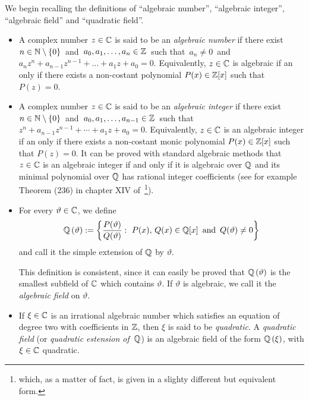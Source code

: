We begin recalling the definitions of ``algebraic number'',
``algebraic integer'', ``algebraic field'' and ``quadratic
field''.
\begin{itemize}

\item A complex number $z \in \mathbb{C}$ is said to be an
\emph{algebraic number\/} if there exist
\mbox{$n \in \mathbb{N}\setminus\left\{0\right\}$}\, and\, $a_0, a_1, \ldots, a_n \in \mathbb{Z}$\,
such that\, $a_n \neq 0$\, and\,
$a_n z^n + a_{n-1} z^{n-1} + \ldots + a_1z + a_0 = 0$.
Equivalently, $z \in \mathbb{C}$ is algebraic if an only if
there exists a non-costant polynomial $P(x) \in \mathbb{Z}[x]$
such that $P(z) = 0$.

\item A complex number $z \in \mathbb{C}$ is said to be an
\emph{algebraic integer\/} if there exist
\mbox{$n \in \mathbb{N}\setminus\left\{0\right\}$}\, and\,
$a_0, a_1, \ldots, a_{n-1} \in \mathbb{Z}$\, such that\,
$z^n + a_{n-1}z^{n-1} + \cdots + a_1z + a_0 = 0$.
Equivalently, $z \in \mathbb{C}$ is an algebraic integer if an
only if there exists a non-costant monic polynomial
$P(x) \in \mathbb{Z}[x]$ such that $P(z) = 0$. It can be proved with
standard algebraic methods that $z \in \mathbb{C}$ is an algebraic
integer if and only if it is algebraic over $\mathbb{Q}$ and its
minimal polynomial over $\mathbb{Q}$ has rational integer
coefficients (see for example Theorem (236) in chapter XIV
of~\cite{H&W}\footnote{which, as a matter of fact, is given
in a slighty different but equivalent form.}).

\item For every $\vartheta \in \mathbb{C}$, we define
\begin{displaymath}
\mathbb{Q}\left(\vartheta\right):= \left\{ \frac{P(\vartheta)}{Q(\vartheta)}:
\ P(x),\, Q(x) \in \mathbb{Q}[x]\ \textrm{\,and\,}\ Q(\vartheta) \neq 0 \right\}
\end{displaymath}
and call it the simple extension of $\mathbb{Q}$ by $\vartheta$.

This definition is consistent, since it can easily be
proved that $\mathbb{Q}\left(\vartheta\right)$ is the smallest subfield
of $\mathbb{C}$ which contains $\vartheta$. If $\vartheta$ is
algebraic, we call it the \emph{algebraic field\/} on
$\vartheta$.

\item If $\xi \in \mathbb{C}$ is an irrational algebraic number
which satisfies an equation of degree two with coefficients in $\mathbb{Z}$,
then $\xi$ is said to be \emph{quadratic\/}. A \emph{quadratic field\/}
(or \emph{quadratic estension of $\,\mathbb{Q}$\/}) is an algebraic field of the
form $\mathbb{Q}\left(\xi\right)$, with $\xi \in \mathbb{C}$ quadratic.

\end{itemize}

